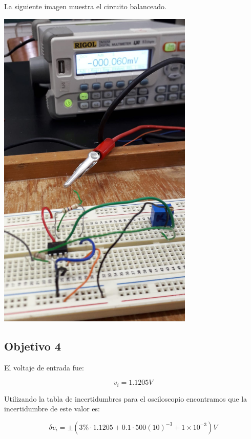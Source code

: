 \documentclass[DIV=calc, paper=a4, fontsize=11pt]{scrartcl}
\newenvironment{Figura}
  {\par\medskip\noindent\minipage{\linewidth}}
  {\endminipage\par\medskip}
\begin{document}
\begin{multicols}{2}
La siguiente imagen muestra el circuito balanceado.

\begin{Figura}
    \centering
    \includegraphics[width=0.7\textwidth]{Objetivo2Balancearimangen.jpeg}
    \label{fig}
\end{Figura}

\subsection*{Objetivo 4}

El voltaje de entrada fue:

\begin{equation*}
    v_{i} = 1.1205 V
\end{equation*}

Utilizando la tabla de incertidumbres para el osciloscopio encontramos que la incertidumbre de este valor es:

\begin{equation*}
    \delta v_{i}=\pm(3\%\cdot 1.1205 + 0.1 \cdot 500 (10)^{-3} + 1\times10^{-3} ) V
\end{equation*}


\end{multicols}
\end{document}
